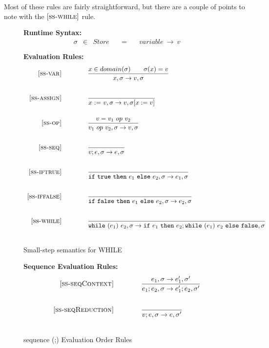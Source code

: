 \documentclass{article}
\newcommand{\rel}[1]{ \mbox{\sc [#1]} }
\begin{document}
\newcommand{\ssrule}[3]{
  \rel{#1} &
  \frac{\strut\begin{array}{@{}c@{}} #2 \end{array}}
       {\strut\begin{array}{@{}c@{}} #3 \end{array}}
   \\~\\
}
\newcommand{\sstep}[4]{{#1},{#2} \rightarrow {#3},{#4}}
\newcommand{\sstepraw}[4]{{#1},{#2} \rightarrow {#3},{#4}}
\newcommand{\ctxt}{C}


Most of these rules are fairly straightforward, but there are a couple of points
to note with the $\rel{ss-while}$ rule.


\begin{figure}[H]\label{fig:smallstep}
\caption{Small-step semantics for WHILE}
{\bf Runtime Syntax:}
\[
\begin{array}{rclcl}
  \sigma & \in & {Store} \quad  & = & \quad {variable} ~\rightarrow ~v \\
  \\
\end{array}
\]
{\bf Evaluation Rules:~~~ \fbox{$\sstepraw{e}{\sigma}{e'}{\sigma'}$}} \\
\[
\begin{array}{r@{\qquad\qquad}l}
\ssrule{ss-var}{
  x \in domain(\sigma) \qquad \sigma(x)=v
}{
  \sstep{x}{\sigma}{v}{\sigma}
}
\ssrule{ss-assign}{
}{
  \sstep{\assign{x}{v}}{\sigma}{v}{\sigma[x:=v]}
}
\ssrule{ss-op}{
  v = v_1 ~op~ v_2
}{
  \sstep{v_1~op~v_2}{\sigma}{v}{\sigma}
}
\ssrule{ss-seq}{
}{
  \sstep{v;e}{\sigma}{e}{\sigma}
}
\ssrule{ss-iftrue}{
}{
  \sstep{\ife{\true}{e_1}{e_2}}{\sigma}{e_1}{\sigma}
}
\ssrule{ss-iffalse}{
}{
  \sstep{\ife{\false}{e_1}{e_2}}{\sigma}{e_2}{\sigma}
}
\ssrule{ss-while}{
}{
  \sstep{\whilee{e_1}{e_2}}{\sigma}{\ife{e_1}{e_2;\whilee{e_1}{e_2}}{\false}}{\sigma}
}
\end{array}
\]
\end{figure}

\begin{figure}[H]\label{fig:seqRules}
\caption{sequence (;) Evaluation Order Rules}
{\bf Sequence Evaluation Rules:} \\
\[
\begin{array}{r@{\qquad\qquad}l}
\ssrule{ss-seqContext}{
  \sstep{e_1}{\sigma}{e_1'}{\sigma'}
}{
  \sstep{e_1 ; e_2}{\sigma}{e_1' ; e_2}{\sigma'}
}
\ssrule{ss-seqReduction}{
}{
  \sstep{v ; e}{\sigma}{e}{\sigma'}
}
\end{array}
\]
\end{figure}
\end{document}
